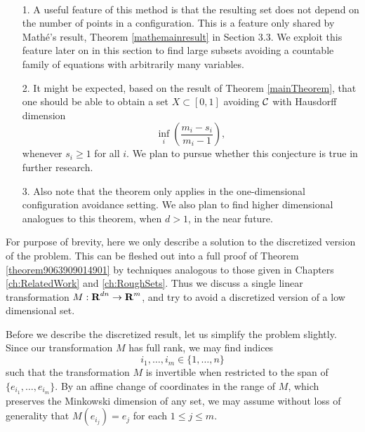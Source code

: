 \begin{remarks}
    \
    \begin{enumerate}
        \item[1.] A useful feature of this method is that the resulting set does not depend on the number of points in a configuration. This is a feature only shared by Math\'{e}'s result, Theorem \ref{mathemainresult} in Section 3.3. We exploit this feature later on in this section to find large subsets avoiding a countable family of equations with arbitrarily many variables.

        \item[2.] It might be expected, based on the result of Theorem \ref{mainTheorem}, that one should be able to obtain a set $X \subset [0,1]$ avoiding $\operatorname{\mathcal{C}}$ with Hausdorff dimension
        \[ \inf_i \left( \frac{m_i - s_i}{m_i - 1} \right), \]
        whenever $s_i \geq 1$ for all $i$. We plan to pursue whether this conjecture is true in further research.

        \item[3.] Also note that the theorem only applies in the one-dimensional configuration avoidance setting. We also plan to find higher dimensional analogues to this theorem, when $d > 1$, in the near future.
    \end{enumerate}
\end{remarks}

For purpose of brevity, here we only describe a solution to the discretized version of the problem. This can be fleshed out into a full proof of Theorem \ref{theorem9063909014901} by techniques analogous to those given in Chapters \ref{ch:RelatedWork} and \ref{ch:RoughSets}. Thus we discuss a single linear transformation $M: \operatorname{\mathbf{R}}^{dn} \to \operatorname{\mathbf{R}}^m$, and try to avoid a discretized version of a low dimensional set.

Before we describe the discretized result, let us simplify the problem slightly. Since our transformation $M$ has full rank, we may find indices
%
\[ i_1, \dots, i_m \in \{ 1, \dots, n \} \]
%
such that the transformation $M$ is invertible when restricted to the span of $\{ e_{i_1}, \dots, e_{i_m} \}$. By an affine change of coordinates in the range of $M$, which preserves the Minkowski dimension of any set, we may assume without loss of generality that $M(e_{i_j}) = e_j$ for each $1 \leq j \leq m$.

